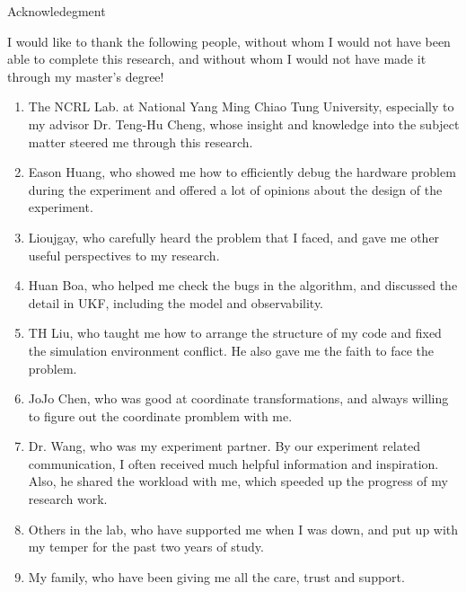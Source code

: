 \newpage
\begin{center}
  \LARGE


    
  Acknowledegment \\[0.5cm]	
\end{center}

\normalsize 
I would like to thank the following people, without whom I would not have been able to complete this research, and without whom I would not have made it through my master's degree!
\begin{enumerate}
  \item The NCRL Lab. at National Yang Ming Chiao Tung University, especially to my advisor Dr. Teng-Hu Cheng, whose insight and knowledge into the subject matter steered me through this research.
  \item Eason Huang, who showed me how to efficiently debug the hardware problem during the experiment and offered a lot of opinions about the design of the experiment.
  \item Lioujgay, who carefully heard the problem that I faced, and gave me other useful perspectives to my research.
  \item Huan Boa, who helped me check the bugs in the algorithm, and discussed the detail in UKF, including the model and observability.
  \item TH Liu, who taught me how to arrange the structure of my code and fixed the simulation environment conflict. He also gave me the faith to face the problem.
  \item JoJo Chen, who was good at coordinate transformations, and always willing to figure out the coordinate promblem with me.
  \item Dr. Wang, who was my experiment partner. By our experiment related communication, I often received much helpful information and inspiration. Also, he shared the workload with me, which speeded up the progress of my research work.
  \item Others in the lab, who have supported me when I was down, and put up with my temper for the past two years of study.
  \item My family, who have been giving me all the care, trust and support.
\end{enumerate}